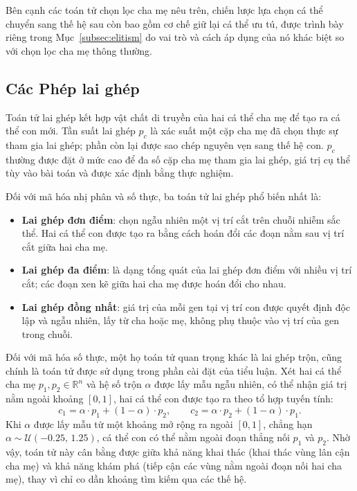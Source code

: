 Bên cạnh các toán tử chọn lọc cha mẹ nêu trên, chiến lược lựa chọn cá
thể chuyển sang thế hệ sau còn bao gồm cơ chế giữ lại cá thể ưu tú,
được trình bày riêng trong Mục~\ref{subsec:elitism} do vai trò và cách
áp dụng của nó khác biệt so với chọn lọc cha mẹ thông thường.

\subsection*{Các Phép lai ghép}
\label{subsec:lai-ghep}

Toán tử lai ghép kết hợp vật chất di truyền của hai cá thể cha mẹ để
tạo ra cá thể con mới. Tần suất lai ghép $p_c$ là xác suất một cặp cha
mẹ đã chọn thực sự tham gia lai ghép; phần còn lại được sao chép
nguyên vẹn sang thế hệ con. $p_c$ thường được đặt ở mức cao để đa số
cặp cha mẹ tham gia lai ghép, giá trị cụ thể tùy vào bài toán và được
xác định bằng thực nghiệm.

Đối với mã hóa nhị phân và số thực, ba toán tử lai ghép phổ biến nhất
là:
\begin{itemize}
    \item \textbf{Lai ghép đơn điểm}: chọn
    ngẫu nhiên một vị trí cắt trên chuỗi nhiễm sắc thể. Hai cá thể con
    được tạo ra bằng cách hoán đổi các đoạn nằm sau vị trí cắt giữa hai
    cha mẹ.
    \item \textbf{Lai ghép đa điểm}: là dạng
    tổng quát của lai ghép đơn điểm với nhiều vị trí cắt; các đoạn xen
    kẽ giữa hai cha mẹ được hoán đổi cho nhau.
    \item \textbf{Lai ghép đồng nhất}: giá trị của
    mỗi gen tại vị trí con được quyết định độc lập và ngẫu nhiên, lấy
    từ cha hoặc mẹ, không phụ thuộc vào vị trí của gen trong chuỗi.
\end{itemize}

Đối với mã hóa số thực, một họ toán tử quan trọng khác là lai ghép
trộn, cũng chính là toán tử được sử
dụng trong phần cài đặt của tiểu luận. Xét hai cá thể cha mẹ
$p_1, p_2 \in \mathbb{R}^n$ và hệ số trộn $\alpha$ được lấy mẫu ngẫu
nhiên, có thể nhận giá trị nằm ngoài khoảng $[0, 1]$, hai cá thể con
được tạo ra theo tổ hợp tuyến tính:
\begin{equation}
c_1 = \alpha \cdot p_1 + (1-\alpha) \cdot p_2,
\qquad
c_2 = \alpha \cdot p_2 + (1-\alpha) \cdot p_1.
\label{eq:blend-crossover}
\end{equation}
Khi $\alpha$ được lấy mẫu từ một khoảng mở rộng ra ngoài $[0, 1]$,
chẳng hạn $\alpha \sim \mathcal{U}(-0.25,\, 1.25)$, cá thể con có thể
nằm ngoài đoạn thẳng nối $p_1$ và $p_2$. Nhờ vậy, toán tử này cân bằng
được giữa khả năng khai thác (khai thác vùng lân cận cha mẹ) và khả
năng khám phá (tiếp cận các vùng nằm ngoài đoạn nối hai cha mẹ), thay
vì chỉ co dần khoảng tìm kiếm qua các thế hệ.

